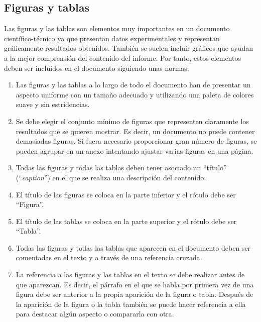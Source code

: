 \documentclass[11pt]{article}
\begin{document}
\subsection{Figuras y tablas}

Las figuras y las tablas son elementos muy importantes en un documento científico-técnico ya que presentan datos experimentales y representan gráficamente resultados obtenidos. También se suelen incluir gráficos que ayudan a la mejor comprensión del contenido del informe. Por tanto, estos elementos deben ser incluidos en el documento siguiendo unas normas:

\begin{enumerate}

    \item Las figuras y las tablas a lo largo de todo el documento han de presentar un aspecto uniforme con un tamaño adecuado y utilizando una paleta de colores suave y sin estridencias.

    \item Se debe elegir el conjunto mínimo de figuras que representen claramente los resultados que se quieren mostrar. Es decir, un documento no puede contener demasiadas figuras. Si fuera necesario proporcionar gran número de figuras, se pueden agrupar en un anexo intentando ajustar varias figuras en una página.

    \item Todas las figuras y todas las tablas deben tener asociado un ``título'' (``\textit{caption}'') en el que se realiza una descripción del contenido.

    \item El título de las figuras se coloca en la parte inferior y el rótulo debe ser ``Figura''.

    \item El título de las tablas se coloca en la parte superior y el rótulo debe ser ``Tabla''.
    
    \item Todas las figuras y todas las tablas que aparecen en el documento deben ser comentadas en el texto y a través de una referencia cruzada.
    
    \item La referencia a las figuras y las tablas en el texto se debe realizar antes de que aparezcan. Es decir, el párrafo en el que se habla por primera vez de una figura debe ser anterior a la propia aparición de la figura o tabla. Después de la aparición de la figura o la tabla también se puede hacer referencia a ella para destacar algún aspecto o compararla con otra.
    

\end{enumerate}
\end{document}
